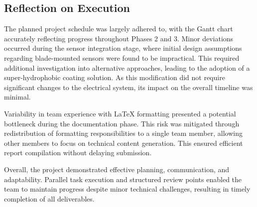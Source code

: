\documentclass[11pt,a4paper]{article}
\begin{document}
\subsection{Reflection on Execution}
The planned project schedule was largely adhered to, with the Gantt chart accurately reflecting progress throughout Phases 2 and 3. Minor deviations occurred during the sensor integration stage, where initial design assumptions regarding blade-mounted sensors were found to be impractical. This required additional investigation into alternative approaches, leading to the adoption of a super-hydrophobic coating solution. As this modification did not require significant changes to the electrical system, its impact on the overall timeline was minimal.

Variability in team experience with LaTeX formatting presented a potential bottleneck during the documentation phase. This risk was mitigated through redistribution of formatting responsibilities to a single team member, allowing other members to focus on technical content generation. This ensured efficient report compilation without delaying submission.

Overall, the project demonstrated effective planning, communication, and adaptability. Parallel task execution and structured review points enabled the team to maintain progress despite minor technical challenges, resulting in timely completion of all deliverables.
\end{document}
